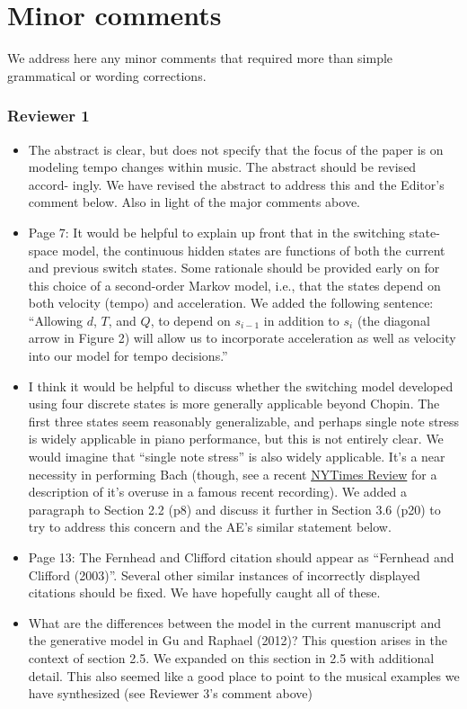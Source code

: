 \documentclass[12pt]{article}
\newcommand{\sresp}[1]{\textcolor{cobalt}{#1}}
\begin{document}
\section*{Minor comments}


We address here any minor comments that required more than simple grammatical or wording corrections.

\subsubsection*{Reviewer 1}
\begin{itemize}
\item The abstract is clear, but does not specify that the focus of the paper is on modeling tempo changes within music. The abstract should be revised accord- ingly. \sresp{We have revised the abstract to address this and the Editor's comment below. Also in light of the major comments above.}

\item Page 7: It would be helpful to explain up front that in the switching state- space model, the continuous hidden states are functions of both the current and previous switch states. Some rationale should be provided early on for this choice of a second-order Markov model, i.e., that the states depend on both velocity (tempo) and acceleration. \sresp{We added the following sentence: ``Allowing $d$, $T$, and $Q$,
to depend on $s_{i-1}$ in addition to $s_i$ (the diagonal arrow in
Figure 2) will allow us to incorporate acceleration as
well as velocity into our model for tempo decisions.''}

\item I think it would be helpful to discuss whether the switching model developed using four discrete states is more generally applicable beyond Chopin. The first three states seem reasonably generalizable, and perhaps single note stress is widely applicable in piano performance, but this is not entirely clear.
  \sresp{We would imagine that ``single note stress'' is also widely applicable. It's a near necessity in performing Bach (though, see a recent \href{https://www.nytimes.com/2020/10/04/arts/music/lang-lang-bach-goldberg-variations.html}{NYTimes Review} for a description of it's overuse in a famous recent recording). We added a paragraph to Section 2.2 (p8) and discuss it further in Section 3.6 (p20) to try to address this concern and the AE's similar statement below.}
  

\item Page 13: The Fernhead and Clifford citation should appear as “Fernhead and Clifford (2003)”. Several other similar instances of incorrectly displayed citations should be fixed. \sresp{We have hopefully caught all of these.}

\item What are the differences between the model in the current manuscript and the generative model in Gu and Raphael (2012)? This question arises in the context of section 2.5. \sresp{We expanded on this section in 2.5 with additional detail. This also seemed like a good place to point to the musical examples we have synthesized (see Reviewer 3's comment above)}
\end{itemize}
\end{document}
